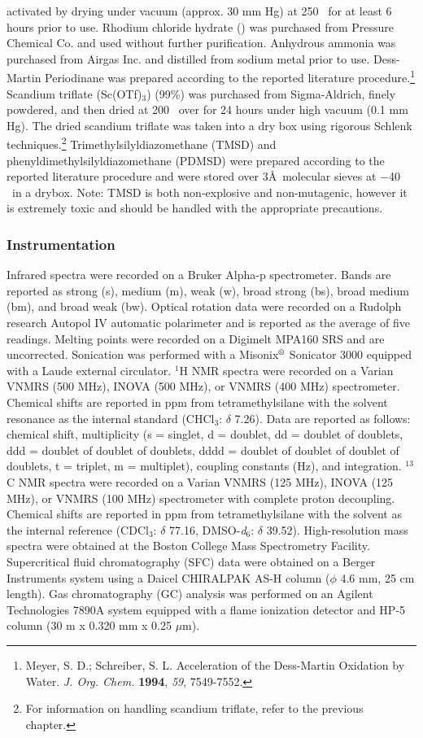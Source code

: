 activated by drying under vacuum (approx. 30 mm Hg) at 250 \degc\  for at least 6 hours prior to
use.
Rhodium chloride hydrate () was purchased from Pressure Chemical Co. and used
without further purification. Anhydrous ammonia was purchased from Airgas Inc. and distilled
from sodium metal prior to use. Dess-Martin Periodinane was prepared according to the reported
literature procedure.\footnote{{\frenchspacing Meyer, S. D.; Schreiber, S. L. Acceleration of the
Dess-Martin Oxidation by Water. \textit{J. Org. Chem.} \textbf{1994}, \textit{59}, 7549-7552.}} Scandium triflate (Sc(OTf)$_3$) (99\%) was purchased from Sigma-Aldrich, finely powdered, and then dried at 200 \degc\  over  for 24 hours under high vacuum (0.1 mm Hg). The dried scandium triflate was taken into a dry box using rigorous Schlenk techniques.\footnote{For information on handling scandium triflate, refer to
 the previous chapter.} Trimethylsilyldiazomethane (TMSD) and
 phenyldimethylsilyldiazomethane (PDMSD) were prepared according to the reported literature
 procedure and were stored over 3\AA\  molecular sieves at $-$40
 \degc\ in a drybox.
 Note:
 TMSD is both non-explosive and non-mutagenic, however it is extremely toxic and should be handled with the appropriate precautions.

\subsubsection{Instrumentation}
Infrared spectra were recorded on a Bruker Alpha-p spectrometer. Bands are reported as
strong (s), medium (m), weak (w), broad strong (bs), broad medium (bm), and broad weak (bw).
Optical rotation data were recorded on a Rudolph research Autopol IV automatic polarimeter and
is reported as the average of five readings. Melting points were recorded on a Digimelt MPA160
SRS and are uncorrected. Sonication was performed with a Misonix$\textsuperscript{\textregistered}$ Sonicator 3000 equipped
with a Laude external circulator. $^1$H NMR spectra were recorded on a Varian VNMRS (500
MHz), INOVA (500 MHz), or VNMRS (400 MHz) spectrometer. Chemical shifts are reported in
ppm from tetramethylsilane with the solvent resonance as the internal standard (CHCl$_3$: $\delta$
7.26).
Data are reported as follows: chemical shift, multiplicity (s = singlet, d = doublet, dd = doublet of
doublets, ddd = doublet of doublet of doublets, dddd = doublet of doublet of doublet of doublets, t
= triplet, m = multiplet), coupling constants (Hz), and integration. $^{13}$C NMR spectra were
recorded on a Varian VNMRS (125 MHz), INOVA (125 MHz), or VNMRS (100 MHz) spectrometer with complete
proton decoupling. Chemical shifts are reported in ppm from tetramethylsilane with the solvent as
the internal reference (CDCl$_3$: $\delta$ 77.16, DMSO-\textit{d}$_6$: $\delta$ 39.52).
High-resolution mass spectra were obtained at the Boston College Mass Spectrometry Facility.
Supercritical fluid chromatography (SFC) data were obtained on a Berger Instruments system using a
Daicel CHIRALPAK AS-H column ($\phi$ 4.6 mm, 25 cm length). Gas chromatography (GC) analysis was performed on an Agilent Technologies 7890A system equipped with a flame ionization detector and HP-5
column (30 m x 0.320 mm x 0.25 $\mu$m).


